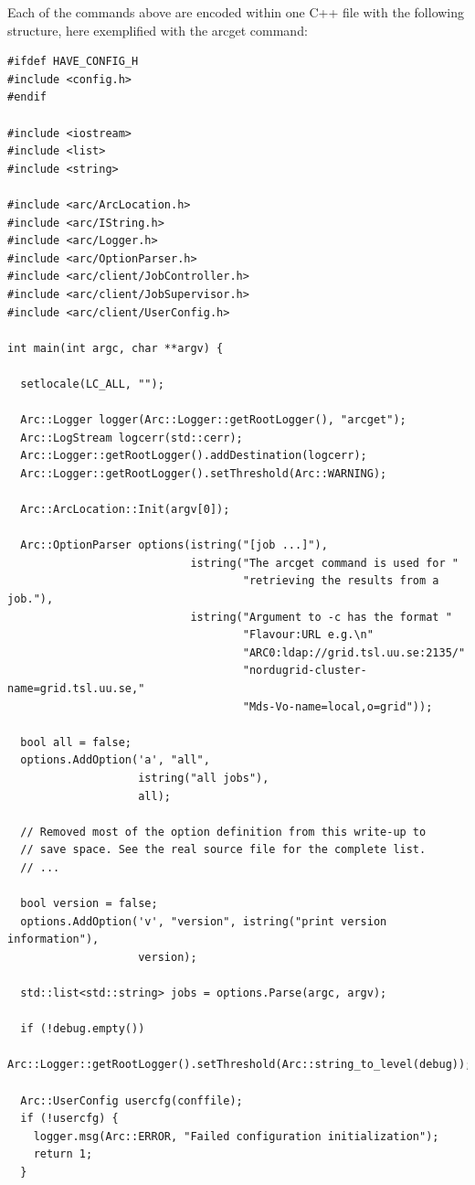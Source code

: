 \documentclass{book}
\begin{document}
Each of the commands above are encoded within one C++ file with the
following structure, here exemplified with the arcget command:

\begin{shaded}
\begin{verbatim}
#ifdef HAVE_CONFIG_H
#include <config.h>
#endif

#include <iostream>
#include <list>
#include <string>

#include <arc/ArcLocation.h>
#include <arc/IString.h>
#include <arc/Logger.h>
#include <arc/OptionParser.h>
#include <arc/client/JobController.h>
#include <arc/client/JobSupervisor.h>
#include <arc/client/UserConfig.h>

int main(int argc, char **argv) {

  setlocale(LC_ALL, "");

  Arc::Logger logger(Arc::Logger::getRootLogger(), "arcget");
  Arc::LogStream logcerr(std::cerr);
  Arc::Logger::getRootLogger().addDestination(logcerr);
  Arc::Logger::getRootLogger().setThreshold(Arc::WARNING);

  Arc::ArcLocation::Init(argv[0]);

  Arc::OptionParser options(istring("[job ...]"),
                            istring("The arcget command is used for "
                                    "retrieving the results from a job."),
                            istring("Argument to -c has the format "
                                    "Flavour:URL e.g.\n"
                                    "ARC0:ldap://grid.tsl.uu.se:2135/"
                                    "nordugrid-cluster-name=grid.tsl.uu.se,"
                                    "Mds-Vo-name=local,o=grid"));

  bool all = false;
  options.AddOption('a', "all",
                    istring("all jobs"),
                    all);

  // Removed most of the option definition from this write-up to
  // save space. See the real source file for the complete list.
  // ...

  bool version = false;
  options.AddOption('v', "version", istring("print version information"),
                    version);

  std::list<std::string> jobs = options.Parse(argc, argv);

  if (!debug.empty())
    Arc::Logger::getRootLogger().setThreshold(Arc::string_to_level(debug));

  Arc::UserConfig usercfg(conffile);
  if (!usercfg) {
    logger.msg(Arc::ERROR, "Failed configuration initialization");
    return 1;
  }


\end{verbatim}
\end{shaded}
\end{document}
